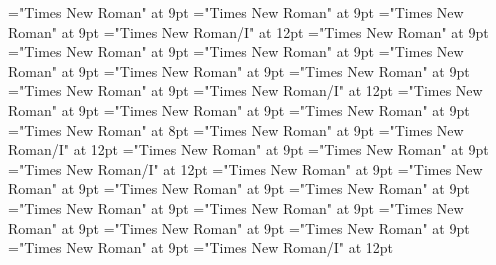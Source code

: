 \documentclass[gps1,twoside]{article}
\begin{document}
\font\nameslotslotsmorphosyntaxanalysissharedgrammaticalinfosensesentrybefore="Times New Roman" at 9pt
\font\spannameslotslotsmorphosyntaxanalysissharedgrammaticalinfosensesentrylastchildafter="Times New Roman" at 9pt
\font\morphosyntaxanalysissensesensesentryafter="Times New Roman" at 9pt
\font\morphosyntaxanalysissensesensesentry="Times New Roman/I" at 12pt
\font\partofspeechmorphosyntaxanalysissensesensesentrybefore="Times New Roman" at 9pt
\font\spanpartofspeechmorphosyntaxanalysissensesensesentrylastchildafter="Times New Roman" at 9pt
\font\slotsmorphosyntaxanalysissensesensesentrybefore="Times New Roman" at 9pt
\font\nameslotslotsmorphosyntaxanalysissensesensesentrybefore="Times New Roman" at 9pt
\font\spannameslotslotsmorphosyntaxanalysissensesensesentrylastchildafter="Times New Roman" at 9pt
\font\sensetypesensesensesentrybefore="Times New Roman" at 9pt
\font\sensetypesensesensesentryafter="Times New Roman" at 9pt
\font\sensetypesensesensesentry="Times New Roman/I" at 12pt
\font\abbreviationsensetypesensesensesentrybefore="Times New Roman" at 9pt
\font{}="Times New Roman" at 9pt
\font\spandefinitionorglosssensesensesentrylastchildafter="Times New Roman" at 9pt
\font\exampleexampleexamplessensesensesentrybefore="Times New Roman" at 8pt
\font\examplessensesensesentryafter="Times New Roman" at 9pt
\font\spanbzhexampleexampleexamplessensesensesentry="Times New Roman/I" at 12pt
\font\exampleexampleexamplessensesensesentrybefore="Times New Roman" at 9pt
\font\spanexampleexampleexamplessensesensesentrylastchildafter="Times New Roman" at 9pt
\font\spanexampleexampleexamplessensesensesentry="Times New Roman/I" at 12pt
\font\translationtranslationtranslationsexampleexamplessensesensesentrybefore="Times New Roman" at 9pt
\font\spantranslationtranslationtranslationsexampleexamplessensesensesentrylastchildafter="Times New Roman" at 9pt
\font\encyclopedicinfosensesensesentrybefore="Times New Roman" at 9pt
\font\spanencyclopedicinfosensesensesentryfirstchildbefore="Times New Roman" at 9pt
\font\spanencyclopedicinfosensesensesentrylastchildafter="Times New Roman" at 9pt
\font\restrictionssensesensesentrybefore="Times New Roman" at 9pt
\font\spanrestrictionssensesensesentryfirstchildbefore="Times New Roman" at 9pt
\font\spanrestrictionssensesensesentrylastchildafter="Times New Roman" at 9pt
\font\lexsensereferencessensesensesentrybefore="Times New Roman" at 9pt
\font\lexsensereferencessensesensesentryafter="Times New Roman" at 9pt
\font\spanenownertypeabbreviationlexsensereferencelexsensereferencessensesensesentry="Times New Roman/I" at 12pt
\end{document}
